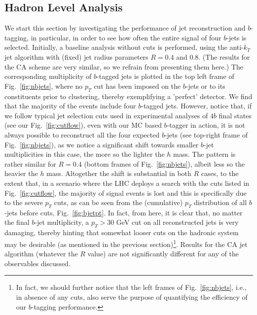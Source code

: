 \documentclass[12pt]{article}
\begin{document}
\subsection{Hadron Level Analysis}
We start this section by investigating  the performance of jet reconstruction and $b$-tagging, in particular, in order
to see how often the entire signal of four $b$-jets is selected. Initially,  a
baseline analysis without cuts is performed, using the anti-$k_T$ jet algorithm \cite{Cacciari:2008gp} with  (fixed) jet
radius parameters $R = 0.4$ and 0.8. (The results for the CA scheme are very similar, so we refrain from presenting them here.)
The  corresponding multiplicity of $b$-tagged jets  is plotted in the top
left frame of Fig.~\ref{fig:nbjets}, where no $p_T$ cut has been imposed on the $ b$-jets or to its constituents prior to clustering, thereby exemplifying a 'perfect' detector.
We find that the majority of the events include four $b$-tagged jets. However, notice that,
if we follow typical jet selection cuts used in experimental analyses of $4b$ final states (see our Fig.~\ref{fig:cutflow}),
even with our MC based $b$-tagger in action, it is not always
possible to reconstruct all the four expected $b$-jets (see top-right frame of
Fig.~\ref{fig:nbjets}), as we notice a significant shift towards smaller $b$-jet multiplicities in this case, the more so the lighter the $h$ mass. The pattern is rather similar for $R=0.4$ (bottom frames of Fig.~\ref{fig:nbjets}), albeit less so the heavier the $h$ mass. Altogether the shift is substantial in both $R$ cases, to the extent that, in  a scenario where the LHC deploys a
search with the cuts listed in  Fig.~\ref{fig:cutflow}, the majority of signal events is lost and this is specifically due to the severe $p_T$ cuts,
as can be seen from the (cumulative) $p_T$ distribution of all $b$-jets before cuts,  Fig.~\ref{fig:bjetpt}. In fact, from here, it is clear that, no matter the final $b$-jet multiplicity, a $p_T>30$ GeV cut on all reconstructed jets  is very damaging, thereby hinting that somewhat looser cuts on the hadronic system may be desirable (as mentioned in the previous section)\footnote{In fact, we should further notice that the left frames of
Fig.~\ref{fig:nbjets}, i.e., in absence of any cuts, also serve the purpose of quantifying the efficiency of our $b$-tagging performance.}.  Results for the CA jet algorithm (whatever the $R$ value) are not significantly different for any of the observables discussed.
%
%
\end{document}
